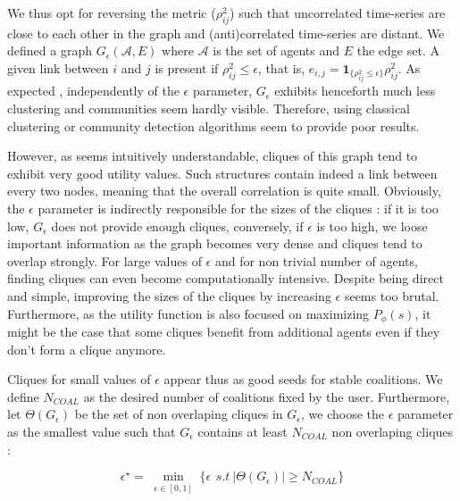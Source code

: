 \documentclass[conference]{IEEEtran}
\begin{document}
We thus opt for reversing the metric ($ \rho_{ij}^{2} $) such that uncorrelated time-series are close to each other in the graph and (anti)correlated time-series are distant. We defined a graph $G_\epsilon(\mathcal{A},E)$ where $\mathcal{A}$ is the set of agents and $ E $ the edge set. A given link between $ i $ and $ j $ is present if $ \rho_{ij}^{2} \leq \epsilon $, that is, $ e_{i,j} = \mathbf{1}_{\{\rho_{ij}^{2} \leq \epsilon \}}\rho_{ij}^{2} $. As expected \cite{Onnela2004}, independently of the $ \epsilon $ parameter, $ G_{\epsilon } $ exhibits henceforth much less clustering and communities seem hardly visible. Therefore, using classical clustering or community detection algorithms seem to provide poor results. 

However, as seems intuitively understandable, cliques of this graph tend to exhibit very good utility values. Such  structures contain indeed a link between every two nodes, meaning that the overall correlation is quite small. Obviously, the $ \epsilon $ parameter is indirectly responsible for the sizes of the cliques : if it is too low, $ G_{\epsilon} $ does not provide enough cliques, conversely, if $\epsilon $ is too high, we loose important information as the graph becomes very dense and cliques tend to overlap strongly. For large values of $ \epsilon $ and for non trivial number of agents, finding cliques can even become computationally intensive. Despite being direct and simple, improving the sizes of the cliques by increasing $ \epsilon $ seems too brutal. Furthermore, as the utility function is also focused on maximizing $ P_{\phi}(s) $, it might be the case that some cliques benefit from additional agents even if they don't form a clique anymore.

Cliques for small values of $ \epsilon $ appear thus as good seeds for stable coalitions. We define $ N_{COAL} $ as the desired number of coalitions fixed by the user. Furthermore, let $ \Theta(G_{\epsilon}) $ be the set of non overlaping cliques in $ G_{\epsilon} $, we choose the $ \epsilon $ parameter as the smallest value such that $ G_{\epsilon} $ contains at least $ N_{COAL} $ non overlaping cliques :

\begin{equation}
\epsilon^{\star} = \min_{\substack{ \epsilon \in [0,1] }} \Big\{ \epsilon\,\ s.t\ |\Theta(G_{\epsilon})| \geq N_{COAL} \Big\}
\end{equation}
\end{document}
